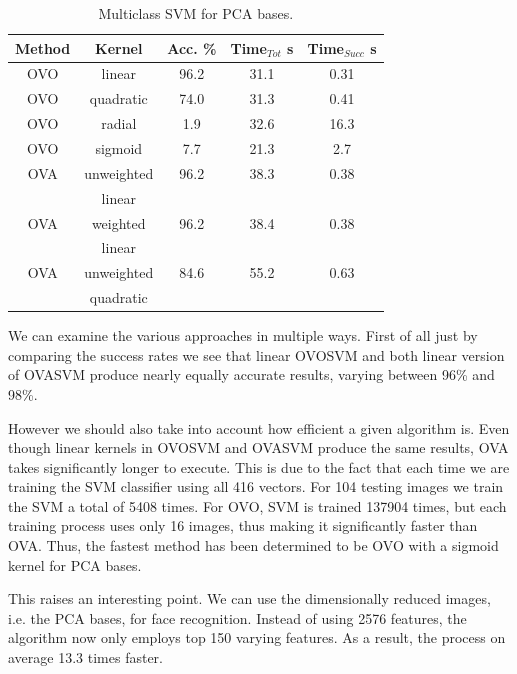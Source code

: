 \documentclass[10pt,twocolumn,letterpaper]{article}
\begin{document}
\begin{table}[H]
\begin{center}
\caption{Multiclass SVM for PCA bases.}  \label{tab:pcasvm}
\small
\begin{tabular}{||c c c c c||}
\hline
\bf Method & \bf Kernel & \bf Acc. \% & \bf Time$_{Tot}$ s & \bf Time$_{Succ}$ s\\ [0.5ex]
\hline \hline
OVO & linear & 96.2 & 31.1 & 0.31\\ [0.5ex]
\hline
OVO & quadratic & 74.0 & 31.3 & 0.41\\ [0.5ex]
\hline
OVO & radial & 1.9 & 32.6 & 16.3\\ [0.5ex]
\hline
OVO & sigmoid & 7.7 & 21.3 & 2.7\\ [0.5ex]
\hline \hline
OVA & unweighted & 96.2 & 38.3 & 0.38\\ [0.5ex]
& linear & & & \\ [0.5ex]
\hline
OVA & weighted & 96.2 & 38.4 & 0.38\\ [0.5ex]
 & linear & & & \\ [0.5ex]
\hline
OVA & unweighted & 84.6 & 55.2 & 0.63\\ [0.5ex]
 & quadratic & & & \\ [0.5ex]
\hline
\end{tabular}
\end{center}

\end{table}

We can examine the various approaches in multiple ways. First of all just by comparing the success rates we see that linear OVOSVM and both linear version of OVASVM produce nearly equally accurate results, varying between 96\% and 98\%.

However we should also take into account how efficient a given algorithm is. Even though linear kernels in OVOSVM and OVASVM produce the same results, OVA takes significantly longer to execute. This is due to the fact that each time we are training the SVM classifier using all 416 vectors. For 104 testing images we train the SVM a total of 5408 times. For OVO, SVM is trained 137904 times, but each training process uses only 16 images, thus making it significantly faster than OVA. Thus, the fastest method has been determined to be OVO with a sigmoid kernel for PCA bases.

This raises an interesting point. We can use the dimensionally reduced images, i.e. the PCA bases, for face recognition. Instead of using 2576 features, the algorithm now only employs top 150 varying features. As a result, the process on average 13.3 times faster.
\end{document}
